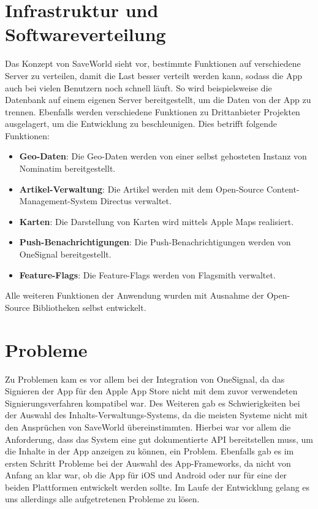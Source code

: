 \documentclass[../main.tex]{subfiles}
\begin{document}
    \section{Infrastruktur und Softwareverteilung}
    Das Konzept von SaveWorld sieht vor, bestimmte Funktionen auf verschiedene Server zu verteilen, damit die Last besser verteilt werden kann, sodass die App auch bei vielen Benutzern noch schnell läuft.
    So wird beispielsweise die Datenbank auf einem eigenen Server bereitgestellt, um die Daten von der App zu trennen.
    Ebenfalls werden verschiedene Funktionen zu Drittanbieter Projekten ausgelagert, um die Entwicklung zu beschleunigen.
    Dies betrifft folgende Funktionen:
    \begin{itemize}
        \item \textbf{Geo-Daten}: Die Geo-Daten werden von einer selbst gehosteten Instanz von Nominatim bereitgestellt.
        \item \textbf{Artikel-Verwaltung}: Die Artikel werden mit dem Open-Source Content-Management-System Directus verwaltet.
        \item \textbf{Karten}: Die Darstellung von Karten wird mittels Apple Maps realisiert.
        \item \textbf{Push-Benachrichtigungen}: Die Push-Benachrichtigungen werden von OneSignal bereitgestellt.
        \item \textbf{Feature-Flags}: Die Feature-Flags werden von Flagsmith verwaltet.
    \end{itemize}
    Alle weiteren Funktionen der Anwendung wurden mit Ausnahme der Open-Source Bibliotheken selbst entwickelt.


    \section{Probleme}
    Zu Problemen kam es vor allem bei der Integration von OneSignal, da das Signieren
    der App für den Apple App Store nicht mit dem zuvor verwendeten Signierungsverfahren
    kompatibel war.
    Des Weiteren gab es Schwierigkeiten bei der Auswahl des Inhalts-Verwaltungs-Systems,
    da die meisten Systeme nicht mit den Ansprüchen von SaveWorld übereinstimmten.
    Hierbei war vor allem die Anforderung, dass das System eine gut dokumentierte API
    bereitstellen muss, um die Inhalte in der App anzeigen zu können, ein Problem.
    Ebenfalls gab es im ersten Schritt Probleme bei der Auswahl des App-Frameworks, da nicht von
    Anfang an klar war, ob die App für iOS und Android oder nur für eine der beiden Plattformen entwickelt werden sollte.
    Im Laufe der Entwicklung gelang es uns allerdings alle aufgetretenen Probleme zu lösen.
\end{document}
